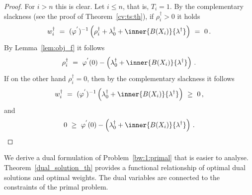 \begin{proof}
  For $i>n$ this is clear.
  Let $i\le n$, that is, $T_i=1$.
  By the complementary slackness (see the proof of Theorem~\ref{cv:ts:th}), if $\rho_i^\dagger>0$ it holds
  \begin{align*}
    w_i^\dagger
    \ 
    =
    \ 
    (
    \varphi^{'}
    )^{-1}
\left( 
  \rho_i^\dagger
  +
    \lambda_0^\dagger + \inner{B(X_i)}{\lambda^\dagger}
\right)
    \ 
=
    \ 
0
\,.
  \end{align*}
  By Lemma~\ref{lem:obj_f} it follows
  \begin{align*}
    \rho_i^\dagger
    \ 
    =
    \ 
    \varphi^{'}
    (0)
    -
    \left( 
    \lambda_0^\dagger + \inner{B(X_i)}{\lambda^\dagger}
    \right)
    \,.
  \end{align*}
  If on the other hand $\rho_i^\dagger=0$, then by the complementary slackness it follows
  \begin{align*}
    w_i^\dagger
    \ 
    =
    \ 
    (
    \varphi^{'}
    )^{-1}
\left( 
    \lambda_0^\dagger + \inner{B(X_i)}{\lambda^\dagger}
\right)
    \ 
\ge 
    \ 
0
\,,
  \end{align*}
  and
  \begin{align*}
    0
    \ 
    \ge
    \ 
    \varphi^{'}
    (0)
    -
    \left( 
    \lambda_0^\dagger + \inner{B(X_i)}{\lambda^\dagger}
    \right)
    \,.
  \end{align*}
\end{proof}
\begin{takeaways}
  We derive a dual formulation of Problem~\ref{bw:1:primal} that is easier to analyse.
  Theorem~\ref{dual_solution_th} provides a functional relationship of optimal dual solutions and 
  optimal weights.
  The dual variables are connected to the constraints of the primal problem.
\end{takeaways}
